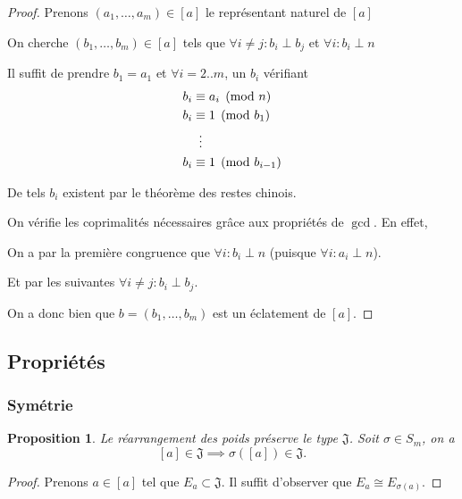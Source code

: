 \documentclass{article}
\newtheorem{proposition}{Proposition}
\newcommand{\J}{\mathfrak{J}}
\begin{document}
\begin{proof}
    Prenons $(a_1, \dots, a_m) \in [a]$ le représentant naturel de $[a]$

    On cherche $(b_1, \dots, b_m) \in [a]$ tels que $\forall i \neq j : b_i \perp b_j$ et $\forall i : b_i \perp n$

    Il suffit de prendre $b_1 = a_1$ et $\forall i = 2..m$, un $b_i$ vérifiant
    \begin{align*}
        b_i & \equiv a_i \pmod n \\
        b_i & \equiv 1 \pmod {b_1} \\
            & \vdotswithin{\equiv} \\
        b_i & \equiv 1 \pmod {b_{i-1}}
    \end{align*}

    De tels $b_i$ existent par le théorème des restes chinois.

    On vérifie les coprimalités nécessaires grâce aux propriétés de $\gcd$. En effet,
    
    \hspace{\parindent} On a par la première congruence que $\forall i : b_i \perp n$ (puisque $\forall i : a_i \perp n$).

    \hspace{\parindent} Et par les suivantes $\forall i \neq j : b_i \perp b_j$.

    On a donc bien que $b = (b_1, \dots, b_m)$ est un éclatement de $[a]$.
\end{proof}

\subsection{Propriétés}

\subsubsection{Symétrie}

\begin{proposition}
    Le réarrangement des poids préserve le type $\J$. Soit $\sigma \in S_m$, on a
    \[ [a] \in \J \implies \sigma([a]) \in \J. \]
\end{proposition}

\begin{proof}
    Prenons $a \in [a]$ tel que $E_a \subset \J$. Il suffit d'observer que $E_a \cong E_{\sigma(a)}$.
\end{proof}
\end{document}
